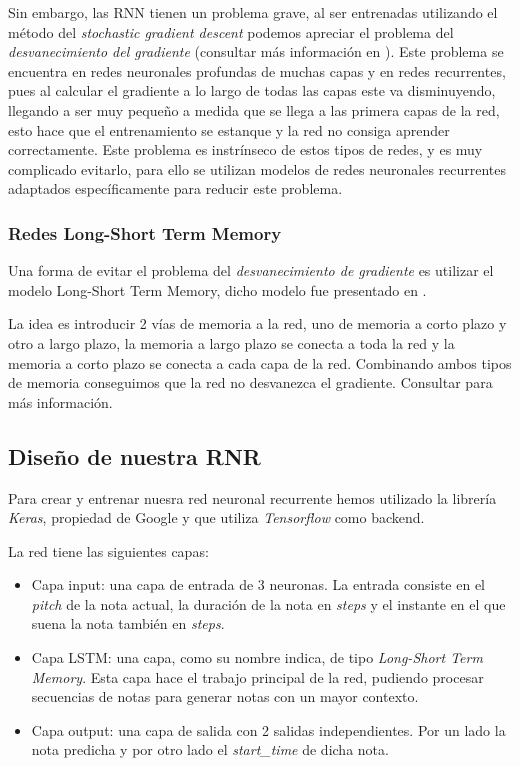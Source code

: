     Sin embargo, las RNN tienen un problema grave, al ser entrenadas utilizando el método del \textit{stochastic gradient descent} podemos apreciar el problema del \textit{desvanecimiento del gradiente} (consultar más información en \cite{M.A.Nielsen_Chapter5}). Este problema se encuentra en redes neuronales profundas de muchas capas y en redes recurrentes, pues al calcular el gradiente a lo largo de todas las capas este va disminuyendo, llegando a ser muy pequeño a medida que se llega a las primera capas de la red, esto hace que el entrenamiento se estanque y la red no consiga aprender correctamente. Este problema es instrínseco de estos tipos de redes, y es muy complicado evitarlo, para ello se utilizan modelos de redes neuronales recurrentes adaptados específicamente para reducir este problema.

    \subsubsection{Redes Long-Short Term Memory}
    \label{subsub:redesLSTM}
    Una forma de evitar el problema del \textit{desvanecimiento de gradiente} es utilizar el modelo Long-Short Term Memory, dicho modelo fue presentado en \cite{LSTMArticle}.

    La idea es introducir 2 vías de memoria a la red, uno de memoria a corto plazo y otro a largo plazo, la memoria a largo plazo se conecta a toda la red y la memoria a corto plazo se conecta a cada capa de la red. Combinando ambos tipos de memoria conseguimos que la red no desvanezca el gradiente. Consultar \cite{LSTMWikipedia} para más información.

    \subsection{Diseño de nuestra RNR}
    \label{subsec:disenoRNR}
    Para crear y entrenar nuesra red neuronal recurrente hemos utilizado la librería \textit{Keras}, propiedad de Google y que utiliza \textit{Tensorflow} como backend.

    La red tiene las siguientes capas:
    \begin{itemize}
        \item Capa input: una capa de entrada de 3 neuronas. La entrada consiste en el \textit{pitch} de la nota actual, la duración de la nota en \textit{steps} y el instante en el que suena la nota también en \textit{steps}.
        \item Capa LSTM: una capa, como su nombre indica, de tipo \textit{Long-Short Term Memory}. Esta capa hace el trabajo principal de la red, pudiendo procesar secuencias de notas para generar notas con un mayor contexto.
        \item Capa output: una capa de salida con 2 salidas independientes. Por un lado la nota predicha y por otro lado el \textit{start\_time} de dicha nota.
    \end{itemize}

